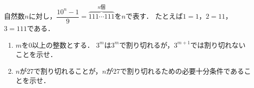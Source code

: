 \documentclass[../../main.tex]{subfiles}
\begin{document}
自然数$n$に対し，$\displaystyle\dfrac{10^n-1}{9}=\overbrace{111 \cdots 111}^{n\text{個}}$を$\boxed{n}$で表す．
たとえば$\boxed{1}=1$，$\boxed{2}=11$，$\boxed{3}=111$である．
\begin{enumerate}
  \item $m$を0以上の整数とする．
    $\boxed{3^m}$は$3^m$で割り切れるが，$3^{m+1}$では割り切れないことを示せ．
  \item $n$が27で割り切れることが，$\boxed{n}$が27で割り切れるための必要十分条件であることを示せ．
\end{enumerate}
\end{document}
